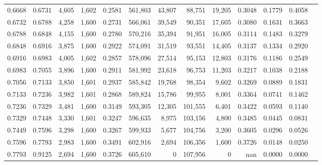 \begin{tabular}{rrrrrrrrrrrrr}
0.6668 & 0.6731 &  4,605 & 1,602 &                                     0.2581 & 561,803 &  43,807 &  88,751 &  19,205 & 0.3048 & 0.1779 & 0.4058 \\
0.6732 & 0.6788 &  4,258 & 1,600 &                                     0.2731 & 566,061 &  39,549 &  90,351 &  17,605 & 0.3080 & 0.1631 & 0.3663 \\
0.6788 & 0.6848 &  4,155 & 1,600 &                                     0.2780 & 570,216 &  35,394 &  91,951 &  16,005 & 0.3114 & 0.1483 & 0.3279 \\
0.6848 & 0.6916 &  3,875 & 1,600 &                                     0.2922 & 574,091 &  31,519 &  93,551 &  14,405 & 0.3137 & 0.1334 & 0.2920 \\
0.6916 & 0.6983 &  4,005 & 1,602 &                                     0.2857 & 578,096 &  27,514 &  95,153 &  12,803 & 0.3176 & 0.1186 & 0.2549 \\
0.6983 & 0.7055 &  3,896 & 1,600 &                                     0.2911 & 581,992 &  23,618 &  96,753 &  11,203 & 0.3217 & 0.1038 & 0.2188 \\
0.7056 & 0.7133 &  3,850 & 1,601 &                                     0.2937 & 585,842 &  19,768 &  98,354 &   9,602 & 0.3269 & 0.0889 & 0.1831 \\
0.7133 & 0.7236 &  3,982 & 1,601 &                                     0.2868 & 589,824 &  15,786 &  99,955 &   8,001 & 0.3364 & 0.0741 & 0.1462 \\
0.7236 & 0.7329 &  3,481 & 1,600 &                                     0.3149 & 593,305 &  12,305 & 101,555 &   6,401 & 0.3422 & 0.0593 & 0.1140 \\
0.7329 & 0.7448 &  3,330 & 1,601 &                                     0.3247 & 596,635 &   8,975 & 103,156 &   4,800 & 0.3485 & 0.0445 & 0.0831 \\
0.7449 & 0.7596 &  3,298 & 1,600 &                                     0.3267 & 599,933 &   5,677 & 104,756 &   3,200 & 0.3605 & 0.0296 & 0.0526 \\
0.7596 & 0.7793 &  2,983 & 1,600 &                                     0.3491 & 602,916 &   2,694 & 106,356 &   1,600 & 0.3726 & 0.0148 & 0.0250 \\
0.7793 & 0.9125 &  2,694 & 1,600 &                                     0.3726 & 605,610 &       0 & 107,956 &       0 &    nan & 0.0000 & 0.0000 \\
\bottomrule
\end{tabular}
